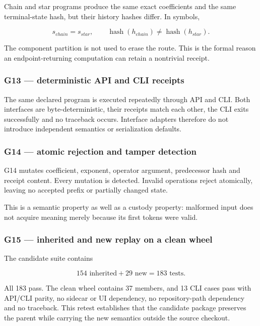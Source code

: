 Chain and star programs produce the same exact coefficients and the same
terminal-state hash, but their history hashes differ. In symbols,

\[
s_{chain}=s_{star},
\qquad
\operatorname{hash}(h_{chain})\ne\operatorname{hash}(h_{star}).
\]

The component partition is not used to erase the route. This is the
formal reason an endpoint-returning computation can retain a nontrivial
receipt.

\subsubsection{G13 --- deterministic API and CLI
receipts}\label{viii-ch02-g13-deterministic-api-and-cli-receipts}

The same declared program is executed repeatedly through API and CLI.
Both interfaces are byte-deterministic, their receipts match each other,
the CLI exits successfully and no traceback occurs. Interface adapters
therefore do not introduce independent semantics or serialization
defaults.

\subsubsection{G14 --- atomic rejection and tamper
detection}\label{viii-ch02-g14-atomic-rejection-and-tamper-detection}

G14 mutates coefficient, exponent, operator argument, predecessor hash
and receipt content. Every mutation is detected. Invalid operations
reject atomically, leaving no accepted prefix or partially changed
state.

This is a semantic property as well as a custody property: malformed
input does not acquire meaning merely because its first tokens were
valid.

\subsubsection{G15 --- inherited and new replay on a clean
wheel}\label{viii-ch02-g15-inherited-and-new-replay-on-a-clean-wheel}

The candidate suite contains

\[
154\text{ inherited}+29\text{ new}=183\text{ tests}.
\]

All 183 pass. The clean wheel contains 37 members, and 13 CLI cases pass
with API/CLI parity, no sidecar or UI dependency, no repository-path
dependency and no traceback. This retest establishes that the candidate
package preserves the parent while carrying the new semantics outside
the source checkout.

